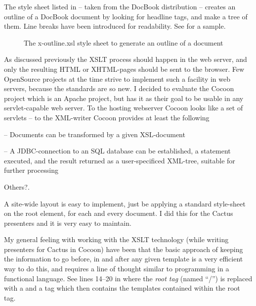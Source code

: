 The style sheet listed in  -- taken from
the DocBook distribution -- creates an outline of a DocBook document
by looking for headline tags, and make a tree of them. Line breaks
have been introduced for readability.  See
 for a sample.

\begin{figure}[tbp]
  \begin{center}
\small
{}    
    \caption{The x-outline.xsl style sheet to generate an outline of a document}
    \label{fig:listing-x-outline.xsl}
  \end{center}
\end{figure}

As discussed previously the XSLT process should happen in the
web server, and only the resulting HTML or XHTML-pages should be sent
to the browser.  Few OpenSource projects at the time strive to
implement such a facility in web servers, because the standards are so
new.  I decided to evaluate the \textsf{Cocoon project} which
is an Apache project, but has it as their goal to be usable in any
servlet-capable web server.   To the hosting webserver Cocoon looks
like a set of servlets -- to the XML-writer Cocoon provides at least
the following

\begin{description}
\item[XSLT] -- Documents can be transformed by a given XSL-document
\item[SQLProcessor] -- A JDBC-connection to an SQL database can be
  established, a statement executed, and the result returned as a
  user-specificed XML-tree, suitable for further processing
\item \textsf{Others?}.
\end{description}

A site-wide layout is easy to implement, just be applying a standard
style-sheet on the root element, for each and every document.  I did
this for the Cactus presenters and it is very easy to maintain.

My general feeling with working with the XSLT technology (while
writing presenters for Cactus in Cocoon) have been that the basic
approach of keeping the information to go before, in and after any
given template is a very efficient way to do this, and requires a line
of thought similar to programming in a functional language.  See lines
14--20 in  where the \textit{root
tag} (named ``/'') is replaced with a  and a  tag
which then contains the templates contained within the root tag.

